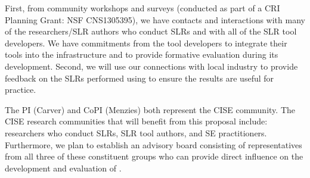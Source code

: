 First, from  community workshops and surveys (conducted as part of a CRI Planning Grant: NSF CNS1305395), we have contacts and interactions with many of the researchers/SLR authors who conduct SLRs and with all of the SLR tool developers. 
We have commitments from the tool developers to integrate their tools into the {\IT} infrastructure and to provide formative evaluation during its development. 
Second, we will use our connections with local industry to provide feedback on the SLRs performed using {\IT} to ensure the results are useful for practice.

The PI (Carver) and CoPI (Menzies) both represent the CISE community. 
The CISE research communities that will benefit from this proposal include: researchers who conduct SLRs, SLR tool authors, and SE practitioners. 
Furthermore, we plan to establish an advisory board consisting of representatives from all three of these constituent groups who can provide direct influence on the development and evaluation of {\IT}. 



% 
% 


